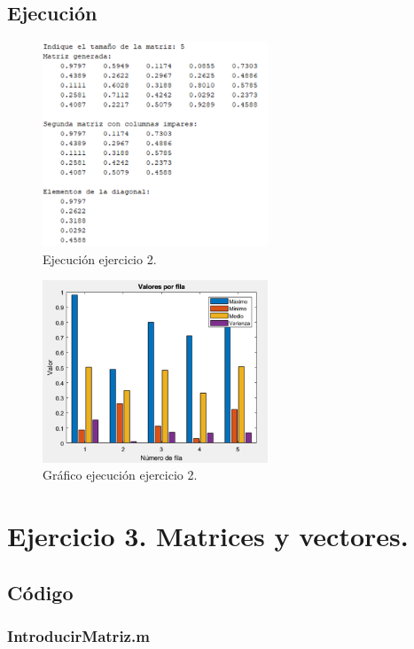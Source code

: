 \documentclass[a4paper, 12pt]{article}
\begin{document}
	\subsection{Ejecución}
	\begin{figure}[htp!]
		\centering
		\includegraphics[width=0.6\textwidth]{figures/ejc2.png}
		\caption{Ejecución ejercicio 2.}
	\end{figure}
	\begin{figure}[htp!]
		\centering
		\includegraphics[width=0.6\textwidth]{figures/graf1.png}
		\caption{Gráfico ejecución ejercicio 2.}
	\end{figure}
	\newpage
	
	\section{Ejercicio 3. Matrices y vectores.}
	
	\subsection{Código}
	\subsubsection*{IntroducirMatriz.m}
	\inputminted[fontsize=\scriptsize, linenos, breaklines=true, xleftmargin=0.75cm, frame=lines]{matlab}{code/IntroducirMatriz.m}
	\inputminted[fontsize=\scriptsize, linenos, breaklines=true, xleftmargin=0.75cm, frame=lines]{matlab}{code/Ejercicio3.m}
	\newpage
\end{document}
